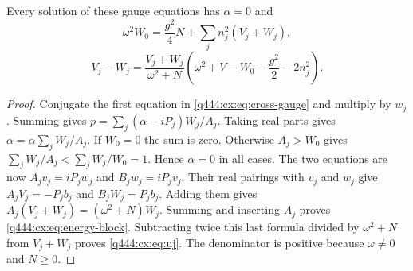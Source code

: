 \begin{lemma}\label{q444:cx:lem:phase}
Every solution of these gauge equations has $\alpha=0$ and
\begin{equation}\label{q444:cx:eq:energy-block}
 \omega^2W_0=\frac{g^2}{4}N+\sum_jn_j^2(V_j+W_j),
\end{equation}
\begin{equation}\label{q444:cx:eq:uj}
 V_j-W_j=\frac{V_j+W_j}{\omega^2+N}
     \left(\omega^2+V-W_0-\frac{g^2}{2}-2n_j^2\right).
\end{equation}
\end{lemma}
\begin{proof}
Conjugate the first equation in \eqref{q444:cx:eq:cross-gauge} and multiply by
$w_j$. Summing gives
$p=\sum_j(\alpha-iP_j)W_j/A_j$.
Taking real parts gives $\alpha=\alpha\sum_jW_j/A_j$.
If $W_0=0$ the sum is zero. Otherwise $A_j>W_0$ gives
$\sum_jW_j/A_j<\sum_jW_j/W_0=1$. Hence $\alpha=0$ in all cases.
The two equations are now $A_jv_j=iP_jw_j$ and $B_jw_j=iP_jv_j$.
Their real pairings with $v_j$ and $w_j$ give
$A_jV_j=-P_jb_j$ and $B_jW_j=P_jb_j$.
Adding them gives
$A_j(V_j+W_j)=(\omega^2+N)W_j$.
Summing and inserting $A_j$ proves \eqref{q444:cx:eq:energy-block}.
Subtracting twice this last formula divided by $\omega^2+N$ from
$V_j+W_j$ proves \eqref{q444:cx:eq:uj}. The denominator is positive because
$\omega\ne0$ and $N\geq0$.
\end{proof}

